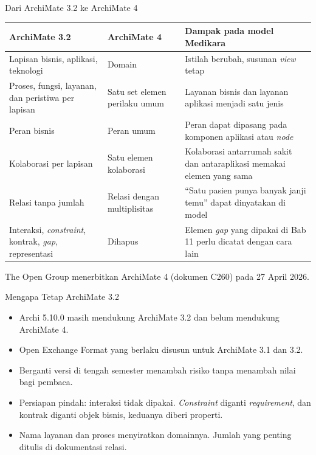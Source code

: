 \documentclass[aspectratio=169, table, 12pt]{beamer}
\begin{document}
\begin{frame}{{\Large Dari ArchiMate 3.2 ke ArchiMate 4}}
  \scriptsize
  \begin{tabularx}{\textwidth}{>{\raggedright\arraybackslash}p{3.8cm}
      >{\raggedright\arraybackslash}p{3.2cm} >{\raggedright\arraybackslash}X}
    \hline
    \textbf{ArchiMate 3.2} & \textbf{ArchiMate 4} & \textbf{Dampak pada model Medikara} \\
    \hline
    Lapisan bisnis, aplikasi, teknologi & Domain & Istilah berubah, susunan \textit{view} tetap \\
    \hline
    Proses, fungsi, layanan, dan peristiwa per lapisan & Satu set elemen perilaku umum & Layanan bisnis dan layanan aplikasi menjadi satu jenis \\
    \hline
    Peran bisnis & Peran umum & Peran dapat dipasang pada komponen aplikasi atau \textit{node} \\
    \hline
    Kolaborasi per lapisan & Satu elemen kolaborasi & Kolaborasi antarrumah sakit dan antaraplikasi memakai elemen yang sama \\
    \hline
    Relasi tanpa jumlah & Relasi dengan multiplisitas & ``Satu pasien punya banyak janji temu'' dapat dinyatakan di model \\
    \hline
    Interaksi, \textit{constraint}, kontrak, \textit{gap}, representasi & Dihapus & Elemen \textit{gap} yang dipakai di Bab 11 perlu dicatat dengan cara lain \\
    \hline
  \end{tabularx}

  \vspace{6pt}
  \small The Open Group menerbitkan ArchiMate 4 (dokumen C260) pada 27 April 2026.
\end{frame}

\begin{frame}{{\Large Mengapa Tetap ArchiMate 3.2}}
  \vspace{6pt}
  \small
  \begin{itemize}
    \item Archi 5.10.0 masih mendukung ArchiMate 3.2 dan belum mendukung ArchiMate 4.
    \item Open Exchange Format yang berlaku disusun untuk ArchiMate 3.1 dan 3.2.
    \item Berganti versi di tengah semester menambah risiko tanpa menambah nilai bagi pembaca.
    \item Persiapan pindah: interaksi tidak dipakai. \textit{Constraint} diganti \textit{requirement},
          dan kontrak diganti objek bisnis, keduanya diberi properti.
    \item Nama layanan dan proses menyiratkan domainnya. Jumlah yang penting ditulis di dokumentasi
          relasi.
  \end{itemize}
\end{frame}
\end{document}
